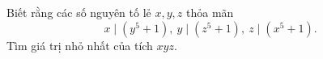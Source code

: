 \ifshowproblem
\begin{problem}\label{example:CHN-2015-NMO-10-P7}
    Biết rằng các số nguyên tố lẻ $x, y, z$ thỏa mãn $$x \mid (y^5 + 1),\ y \mid (z^5 + 1),\ z \mid (x^5 + 1).$$
    Tìm giá trị nhỏ nhất của tích $xyz$.    
\end{problem}
\fi

\footnotemark
{}
\fi